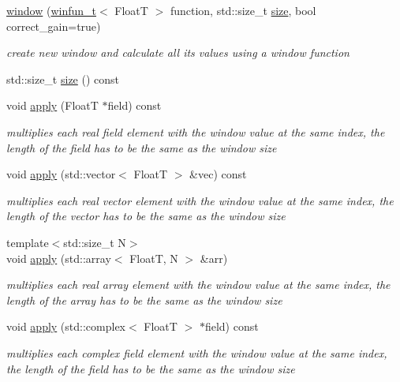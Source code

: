 \begin{DoxyCompactItemize}
\item 
\hyperlink{structdevfix_1_1dsp_1_1window_a9a95322d9d9547f393e528cdfe3ec2aa}{window} (\hyperlink{namespacedevfix_1_1dsp_a6667d1bec03c0d82f87521b87d3fcf24}{winfun\+\_\+t}$<$ FloatT $>$ function, std\+::size\+\_\+t \hyperlink{structdevfix_1_1dsp_1_1window_a24610f1f5682113df6e949575517d171}{size}, bool correct\+\_\+gain=true)
\begin{DoxyCompactList}\small\item\em create new window and calculate all its values using a window function \end{DoxyCompactList}\item 
std\+::size\+\_\+t \hyperlink{structdevfix_1_1dsp_1_1window_a24610f1f5682113df6e949575517d171}{size} () const
\item 
void \hyperlink{structdevfix_1_1dsp_1_1window_aebc5f8902372df2cb349e009660f6752}{apply} (FloatT $\ast$field) const
\begin{DoxyCompactList}\small\item\em multiplies each real field element with the window value at the same index, the length of the field has to be the same as the window size \end{DoxyCompactList}\item 
void \hyperlink{structdevfix_1_1dsp_1_1window_ac048886c4ae01a95d5272cbf73eac542}{apply} (std\+::vector$<$ FloatT $>$ \&vec) const
\begin{DoxyCompactList}\small\item\em multiplies each real vector element with the window value at the same index, the length of the vector has to be the same as the window size \end{DoxyCompactList}\item 
{\footnotesize template$<$std\+::size\+\_\+t N$>$ }\\void \hyperlink{structdevfix_1_1dsp_1_1window_a3c9dc67499f51b6a70657fd71be5faa3}{apply} (std\+::array$<$ FloatT, N $>$ \&arr)
\begin{DoxyCompactList}\small\item\em multiplies each real array element with the window value at the same index, the length of the array has to be the same as the window size \end{DoxyCompactList}\item 
void \hyperlink{structdevfix_1_1dsp_1_1window_a8c378c67016543fe7d69bf84145994e6}{apply} (std\+::complex$<$ FloatT $>$ $\ast$field) const
\begin{DoxyCompactList}\small\item\em multiplies each complex field element with the window value at the same index, the length of the field has to be the same as the window size \end{DoxyCompactList}\item 

\end{DoxyCompactItemize}
